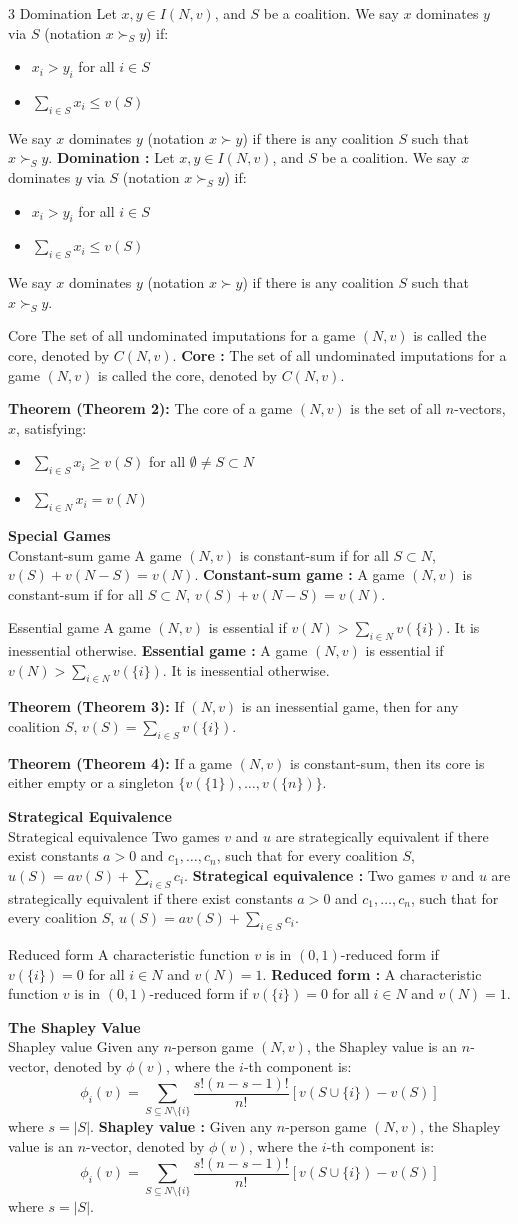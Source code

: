 \documentclass[a4paper,landscape,8pt]{article}
\newcommand{\subheading}[1]{\vspace{1pt}\noindent\textbf{\textcolor{subheading}{#1}}}
\newcommand{\definition}[2][]{\vspace{1pt}\noindent%
  \ifx\relax#1\relax%
    #2%
  \else%
    \textbf{#1 :} #2%
  \fi}
\newcommand{\theorem}[2]{\vspace{1pt}\noindent\textbf{Theorem (#1):} #2}
\begin{document}
\begin{multicols}{3}
	\definition[Domination]{Let $x, y \in I(N, v)$, and $S$ be a coalition. We say $x$ dominates $y$ via $S$ (notation $x \succ_S y$) if:
		\begin{itemize}[leftmargin=10pt,itemsep=0pt]
			\item $x_i > y_i$ for all $i \in S$
			\item $\sum_{i \in S} x_i \leq v(S)$
		\end{itemize}
		We say $x$ dominates $y$ (notation $x \succ y$) if there is any coalition $S$ such that $x \succ_S y$.}

	\definition[Core]{The set of all undominated imputations for a game $(N, v)$ is called the core, denoted by $C(N, v)$.}

	\theorem{Theorem 2}{The core of a game $(N, v)$ is the set of all $n$-vectors, $x$, satisfying:
		\begin{itemize}[leftmargin=10pt,itemsep=0pt]
			\item $\sum_{i \in S} x_i \geq v(S)$ for all $\emptyset \neq S \subset N$
			\item $\sum_{i \in N} x_i = v(N)$
		\end{itemize}}

	\subheading{Special Games}\\
	\definition[Constant-sum game]{A game $(N, v)$ is constant-sum if for all $S \subset N$, $v(S) + v(N - S) = v(N)$.}

	\definition[Essential game]{A game $(N, v)$ is essential if $v(N) > \sum_{i \in N} v(\{i\})$. It is inessential otherwise.}

	\theorem{Theorem 3}{If $(N, v)$ is an inessential game, then for any coalition $S$, $v(S) = \sum_{i \in S} v(\{i\})$.}

	\theorem{Theorem 4}{If a game $(N, v)$ is constant-sum, then its core is either empty or a singleton $\{v(\{1\}), \ldots, v(\{n\})\}$.}

	\subheading{Strategical Equivalence}\\
	\definition[Strategical equivalence]{Two games $v$ and $u$ are strategically equivalent if there exist constants $a > 0$ and $c_1, \ldots, c_n$, such that for every coalition $S$, $u(S) = av(S) + \sum_{i \in S} c_i$.}

	\definition[Reduced form]{A characteristic function $v$ is in $(0, 1)$-reduced form if $v(\{i\}) = 0$ for all $i \in N$ and $v(N) = 1$.}

	\subheading{The Shapley Value}\\
	\definition[Shapley value]{Given any $n$-person game $(N, v)$, the Shapley value is an $n$-vector, denoted by $\phi(v)$, where the $i$-th component is:
		\begin{equation*}
			\phi_i(v) = \sum_{S \subseteq N \setminus \{i\}} \frac{s!(n-s-1)!}{n!}[v(S \cup \{i\}) - v(S)]
		\end{equation*}
		where $s = |S|$.}


\end{multicols}
\end{document}
